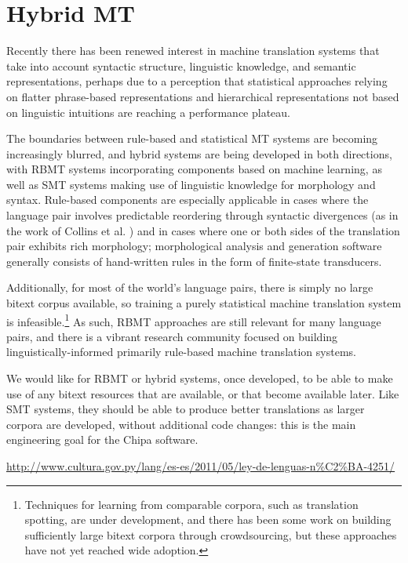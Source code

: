 \section{Hybrid MT}
Recently there has been renewed interest in machine translation systems that
take into account syntactic structure, linguistic knowledge, and semantic
representations, perhaps due to a perception that statistical approaches
relying on flatter phrase-based representations and hierarchical
representations not based on linguistic intuitions are reaching a performance
plateau.

The boundaries between rule-based and statistical MT systems are becoming
increasingly blurred, and hybrid systems are being developed in both
directions, with RBMT systems incorporating components based on machine
learning, as well as SMT systems making use of linguistic knowledge for
morphology and syntax.
Rule-based components are especially applicable in cases where the language
pair involves predictable reordering through syntactic divergences
(as in the work of Collins et al.
\cite{collins-koehn-kucerova:2005:ACL})
and in cases where one or both sides of the translation pair exhibits rich
morphology; morphological analysis and generation software generally consists
of hand-written rules in the form of finite-state transducers.

Additionally, for most of the world's language pairs, there is simply no large
bitext corpus available, so training a purely statistical machine translation
system is infeasible.\footnote{Techniques for learning from comparable corpora,
such as translation spotting, are under development, and there has been some
work on building sufficiently large bitext corpora through crowdsourcing, but
these approaches have not yet reached wide adoption.}
As such, RBMT approaches are still relevant for many language pairs, and there
is a vibrant research community focused on building linguistically-informed
primarily rule-based machine translation systems.

We would like for RBMT or hybrid systems, once developed, to be able to make
use of any bitext resources that are available, or that become available later.
Like SMT systems, they should be able to produce better translations as larger
corpora are developed, without additional code changes: this is the main
engineering goal for the Chipa software.

\urldef{\leydelenguas}\url{http://www.cultura.gov.py/lang/es-es/2011/05/ley-de-lenguas-n%C2%BA-4251/}

